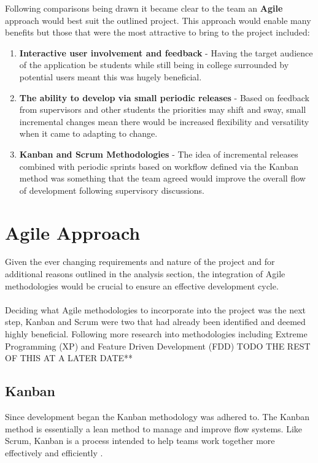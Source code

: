 Following comparisons being drawn it became clear to the team an \textbf{Agile} approach would best suit the outlined project. This approach would enable many benefits but those that were the most attractive to bring to the project included:

\begin{enumerate}
  \item \textbf{Interactive user involvement and feedback} - Having the target audience of the application be students while still being in college surrounded by potential users meant this was hugely beneficial.
  \item \textbf{The ability to develop via small periodic releases} - Based on feedback from supervisors and other students the priorities may shift and sway, small incremental changes mean there would be increased flexibility and versatility when it came to adapting to change.
  \item \textbf{Kanban and Scrum Methodologies} - The idea of incremental releases combined with periodic sprints based on workflow defined via the Kanban method was something that the team agreed would improve the overall flow of development following supervisory discussions.
\end{enumerate}

\section{Agile Approach}
Given the ever changing requirements and nature of the project and for additional reasons outlined in the analysis section, the integration of Agile methodologies would be crucial to ensure an effective development cycle.

\paragraph{}
Deciding what Agile methodologies to incorporate into the project was the next step, Kanban and Scrum were two that had already been identified and deemed highly beneficial. Following more research into methodologies including Extreme Programming (XP) and Feature Driven Development (FDD) TODO THE REST OF THIS AT A LATER DATE**

\subsection{Kanban}
Since development began the Kanban methodology was adhered to. The Kanban method is essentially a lean method to manage and improve flow systems. Like Scrum, Kanban is a process intended to help teams work together more effectively and efficiently \cite{KANBAN_SCRUM}. 

